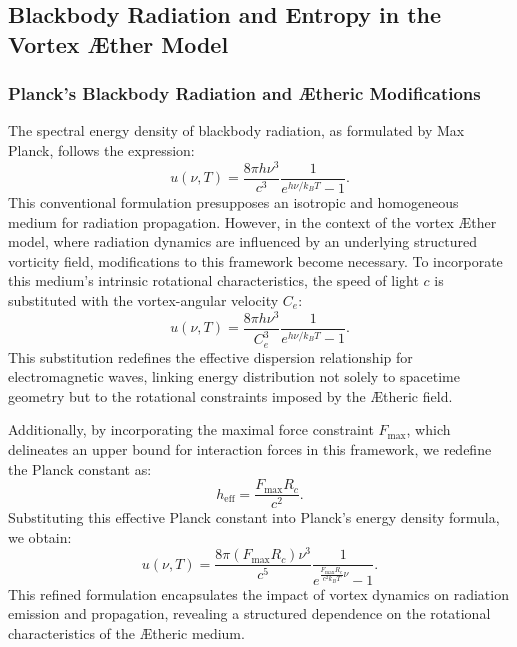 \documentclass[a4paper,10pt]{article}
\begin{document}
    
\subsection{Blackbody Radiation and Entropy in the Vortex Æther Model}


\subsubsection*{Planck's Blackbody Radiation and Ætheric Modifications}
The spectral energy density of blackbody radiation, as formulated by Max Planck, follows the expression:
\begin{equation*}
u(\nu, T) = \frac{8 \pi h \nu^3}{c^3} \frac{1}{e^{h \nu / k_B T} - 1}.
\end{equation*}
This conventional formulation presupposes an isotropic and homogeneous medium for radiation propagation. However, in the context of the vortex Æther model, where radiation dynamics are influenced by an underlying structured vorticity field, modifications to this framework become necessary. To incorporate this medium's intrinsic rotational characteristics, the speed of light $c$ is substituted with the vortex-angular velocity $C_e$:
\begin{equation*}
u(\nu, T) = \frac{8 \pi h \nu^3}{C_e^3} \frac{1}{e^{h \nu / k_B T} - 1}.
\end{equation*}
This substitution redefines the effective dispersion relationship for electromagnetic waves, linking energy distribution not solely to spacetime geometry but to the rotational constraints imposed by the Ætheric field.


Additionally, by incorporating the maximal force constraint $F_{\max}$, which delineates an upper bound for interaction forces in this framework, we redefine the Planck constant as:
\begin{equation*}
h_\text{eff} = \frac{F_{\max} R_c}{c^2}.
\end{equation*}
Substituting this effective Planck constant into Planck's energy density formula, we obtain:
\begin{equation*}
u(\nu, T) = \frac{8 \pi \left( F_{\max} R_c \right) \nu^3}{c^5} \frac{1}{e^{\frac{F_{\max} R_c}{c^2 k_B T} \nu} - 1}.
\end{equation*}
This refined formulation encapsulates the impact of vortex dynamics on radiation emission and propagation, revealing a structured dependence on the rotational characteristics of the Ætheric medium.
\end{document}

